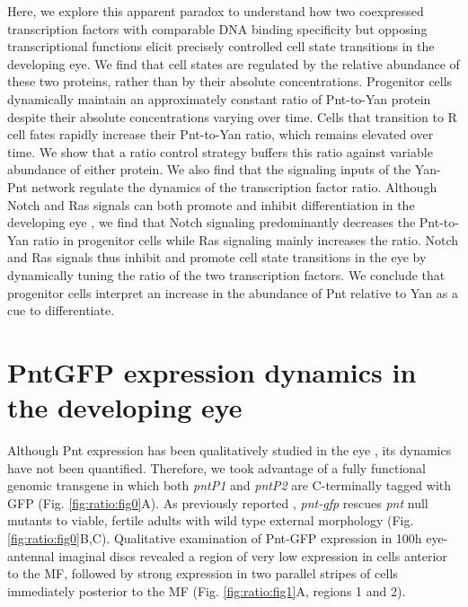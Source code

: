 Here, we explore this apparent paradox to understand how two coexpressed transcription factors with comparable DNA binding specificity but opposing transcriptional functions elicit precisely controlled cell state transitions in the developing eye. We find that cell states are regulated by the relative abundance of these two proteins, rather than by their absolute concentrations. Progenitor cells dynamically maintain an approximately constant ratio of Pnt-to-Yan protein despite their absolute concentrations varying over time. Cells that transition to R cell fates rapidly increase their Pnt-to-Yan ratio, which remains elevated over time. We show that a ratio control strategy buffers this ratio against variable abundance of either protein. We also find that the signaling inputs of the Yan-Pnt network regulate the dynamics of the transcription factor ratio. Although Notch and Ras signals can both promote and inhibit differentiation in the developing eye \cite{Fortini1993,Freeman1996}, we find that Notch signaling predominantly decreases the Pnt-to-Yan ratio in progenitor cells while Ras signaling mainly increases the ratio. Notch and Ras signals thus inhibit and promote cell state transitions in the eye by dynamically tuning the ratio of the two transcription factors. We conclude that progenitor cells interpret an increase in the abundance of Pnt relative to Yan as a cue to differentiate.

\section{PntGFP expression dynamics in the developing eye }

Although Pnt expression has been qualitatively studied in the eye \cite{BoisclairLachance2014}, its dynamics have not been quantified. Therefore, we took advantage of a fully functional genomic transgene in which both \textit{pntP1} and \textit{pntP2} are C-terminally tagged with GFP (Fig. \ref{fig:ratio:fig0}A). As previously reported \cite{BoisclairLachance2014}, \textit{pnt-gfp} rescues \textit{pnt} null mutants to viable, fertile adults with wild type external morphology (Fig. \ref{fig:ratio:fig0}B,C). Qualitative examination of Pnt-GFP expression in 100h eye-antennal imaginal discs revealed a region of very low expression in cells anterior to the MF, followed by strong expression in two parallel stripes of cells immediately posterior to the MF (Fig. \ref{fig:ratio:fig1}A, regions 1 and 2).

